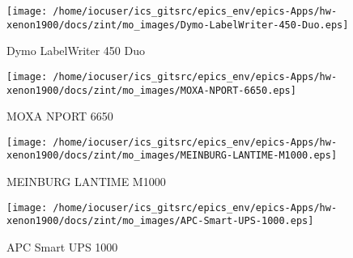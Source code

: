 \noindent
\vspace{1.4cm}
\begin{minipage}{.2\textwidth}
\begin{center}
\texttt{[image: /home/iocuser/ics\_gitsrc/epics\_env/epics-Apps/hw-xenon1900/docs/zint/mo\_images/Dymo-LabelWriter-450-Duo.eps]}
\end{center}
\end{minipage}
\begin{minipage}{.7\textwidth}
Dymo LabelWriter 450 Duo
\end{minipage}


\noindent
\vspace{1.4cm}
\begin{minipage}{.2\textwidth}
\begin{center}
\texttt{[image: /home/iocuser/ics\_gitsrc/epics\_env/epics-Apps/hw-xenon1900/docs/zint/mo\_images/MOXA-NPORT-6650.eps]}
\end{center}
\end{minipage}
\begin{minipage}{.7\textwidth}
MOXA NPORT 6650
\end{minipage}


\noindent
\vspace{1.4cm}
\begin{minipage}{.2\textwidth}
\begin{center}
\texttt{[image: /home/iocuser/ics\_gitsrc/epics\_env/epics-Apps/hw-xenon1900/docs/zint/mo\_images/MEINBURG-LANTIME-M1000.eps]}
\end{center}
\end{minipage}
\begin{minipage}{.7\textwidth}
MEINBURG LANTIME M1000
\end{minipage}


\noindent
\vspace{1.4cm}
\begin{minipage}{.2\textwidth}
\begin{center}
\texttt{[image: /home/iocuser/ics\_gitsrc/epics\_env/epics-Apps/hw-xenon1900/docs/zint/mo\_images/APC-Smart-UPS-1000.eps]}
\end{center}
\end{minipage}
\begin{minipage}{.7\textwidth}
APC Smart UPS 1000
\end{minipage}


